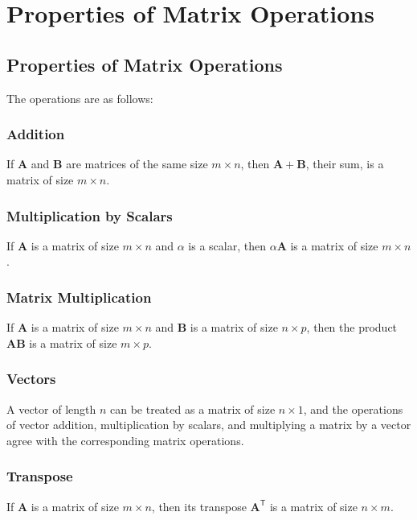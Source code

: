 \chapter{Properties of Matrix Operations}

\section{Properties of Matrix Operations}

The operations are as follows:

\subsection{Addition}

If \(\mathbf{A}\) and \(\mathbf{B}\) are matrices of the same size \(m \times n\), then \(\mathbf{A} + \mathbf{B}\), their sum, is a matrix of size \(m \times n\).

\subsection{Multiplication by Scalars}

If \(\mathbf{A}\) is a matrix of size \(m \times n\) and \(\alpha\) is a scalar, then \(\alpha \mathbf{A}\) is a matrix of size \(m \times n\).

\subsection{Matrix Multiplication}

If \(\mathbf{A}\) is a matrix of size \(m \times n\) and \(\mathbf{B}\) is a matrix of size \(n \times p\), then the product \(\mathbf{AB}\) is a matrix of size \(m \times p\).

\subsection{Vectors}

A vector of length \(n\) can be treated as a matrix of size \(n \times 1\), and the operations of vector addition, multiplication by scalars, and multiplying a matrix by a vector agree with the corresponding matrix operations.

\subsection{Transpose}

If \(\mathbf{A}\) is a matrix of size \(m \times n\), then its transpose \(\mathbf{A}^{\mathsf{T}}\) is a matrix of size \(n \times m\).

